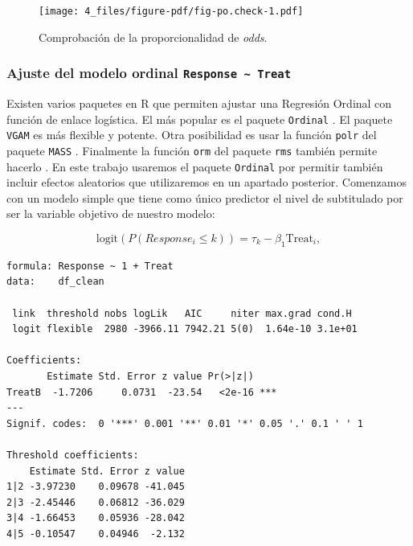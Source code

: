 \documentclass[
  12pt,
  a4paper,
  extrafontsizes,
  onecolumn,
  openright,
  table]{memoir}
\begin{document}
\begin{figure}[h]

{\centering \texttt{[image: 4\_files/figure-pdf/fig-po.check-1.pdf]}

}

\caption{\label{fig-po.check}Comprobación de la proporcionalidad de
\emph{odds}.}

\end{figure}

\hypertarget{ajuste-del-modelo-ordinal-response-treat}{%
\subsubsection{\texorpdfstring{Ajuste del modelo ordinal
\texttt{Response\ \textasciitilde{}\ Treat}}{Ajuste del modelo ordinal Response \textasciitilde{} Treat}}\label{ajuste-del-modelo-ordinal-response-treat}}

Existen varios paquetes en R que permiten ajustar una Regresión Ordinal
con función de enlace logística. El más popular es el paquete
\texttt{Ordinal} \autocite{ordinalR}. El paquete \texttt{VGAM}
\autocite{VGAMR} es más flexible y potente. Otra posibilidad es usar la
función \texttt{polr} del paquete \texttt{MASS} \autocite{MASSR}.
Finalmente la función \texttt{orm} del paquete \texttt{rms} también
permite hacerlo \autocite[ver][]{harrell2015}. En este trabajo usaremos
el paquete \texttt{Ordinal} por permitir también incluir efectos
aleatorios que utilizaremos en un apartado posterior. Comenzamos con un
modelo simple que tiene como único predictor el nivel de subtitulado por
ser la variable objetivo de nuestro modelo:

\[
\text{logit}(P(Response_i \leq k)) = \tau_k - \beta_1 \text{Treat}_i,
\]

\scriptsize

\begin{verbatim}
formula: Response ~ 1 + Treat
data:    df_clean

 link  threshold nobs logLik   AIC     niter max.grad cond.H 
 logit flexible  2980 -3966.11 7942.21 5(0)  1.64e-10 3.1e+01

Coefficients:
       Estimate Std. Error z value Pr(>|z|)    
TreatB  -1.7206     0.0731  -23.54   <2e-16 ***
---
Signif. codes:  0 '***' 0.001 '**' 0.01 '*' 0.05 '.' 0.1 ' ' 1

Threshold coefficients:
    Estimate Std. Error z value
1|2 -3.97230    0.09678 -41.045
2|3 -2.45446    0.06812 -36.029
3|4 -1.66453    0.05936 -28.042
4|5 -0.10547    0.04946  -2.132
\end{verbatim}
\end{document}
